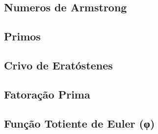 % 

\subsection{Numeros de Armstrong}


\subsection{Primos}


\subsection{Crivo de Eratóstenes}


\subsection{Fatoração Prima}


% 

% 

\subsection{Função Totiente de Euler (φ)}


% 

% 

